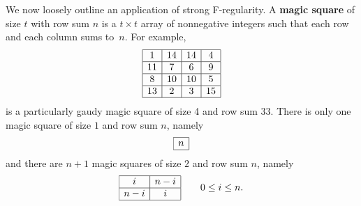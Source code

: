 \documentclass[12pt]{amsart}
\theoremstyle{definition}
\numberwithin{equation}{theorem}
\begin{document}
We now loosely outline an application of strong F-regularity. A \textbf{magic square} of size $t$ with row sum $n$ is a $t\times t$ array of nonnegative integers such that each row and each column sums to~$n$. For example,
\[ \begin{array}{|c|c|c|c|} 
\hline 1 & 14 & 14 & 4  \\
\hline 11 & 7 & 6 & 9 \\
\hline 8 & 10 & 10 & 5 \\
\hline 13 & 2 & 3 & 15 \\
\hline
\end{array}\]
is a particularly gaudy magic square of size 4 and row sum 33.
There is only one magic square of size $1$ and row sum $n$, namely
\[ \begin{array}{|c|} 
\hline n \\
\hline
\end{array}\]
and there are $n+1$ magic squares of size $2$ and row sum $n$, namely
\[ \begin{array}{|c|c|} 
\hline i  & n-i\\
\hline n-i & i \\
\hline
\end{array} \qquad 0\leq i \leq n.
\]
\end{document}
